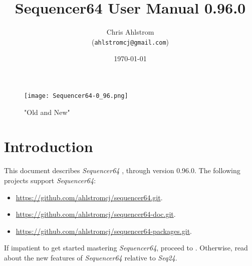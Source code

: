 \documentclass[
 11pt,
 twoside,
 a4paper,
 headinclude,
 footinclude,
 final                                 %
]{article}
\begin{document}
\title{Sequencer64 User Manual 0.96.0}
\author{Chris Ahlstrom \\
   (\texttt{ahlstromcj@gmail.com})}
\date{\today}
\maketitle

\begin{figure}[H]
   \centering 
   \texttt{[image: Sequencer64-0\_96.png]}
   \caption*{"Old and New"}
\end{figure}

\clearpage                             %

\tableofcontents
\listoffigures                         %
\listoftables                          %


\setlength{\parindent}{2em}
\setlength{\parskip}{1ex plus 0.5ex minus 0.2ex}

\section{Introduction}
\label{sec:introduction}

   This document describes \textsl{Sequencer64}
   \cite{sequencer64}, through version 0.96.0.
   The following projects support \textsl{Sequencer64}:

   \begin{itemize}
      \item \url{https://github.com/ahlstromcj/sequencer64.git}.
      \item \url{https://github.com/ahlstromcj/sequencer64-doc.git}.
      \item \url{https://github.com/ahlstromcj/sequencer64-packages.git}.
   \end{itemize}

   If impatient to get started mastering \textsl{Sequencer64},
   proceed to .
   Otherwise, read about the new features of \textsl{Sequencer64}
   relative to \textsl{Seq24}.
\end{document}
